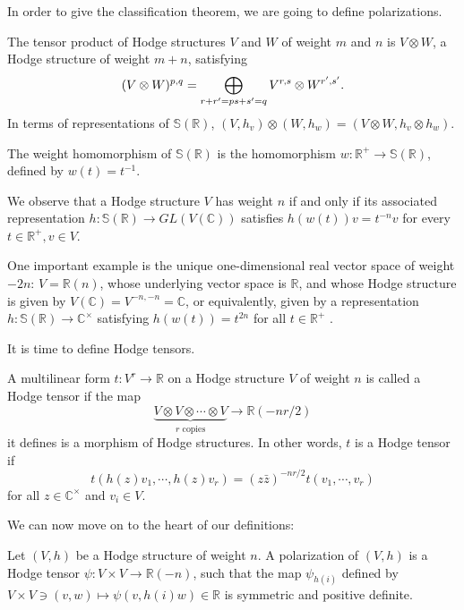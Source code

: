 In order to give the classification theorem, we are going to define polarizations.

\begin{definition}
 \label{definition-tensor-product}
 The tensor product of Hodge structures $V$ and $W$ of weight $m$ and $n$ is $V \otimes W$, a Hodge structure of weight $m+n$, satisfying 
$$
(V\otimes W)^{p,q}=\bigoplus_{r+r'=p \\ s+s'=q} V^{r,s} \otimes W^{r',s'}.
$$
In terms of representations of $\mathbb S(\mathbb R)$, $(V,h_v)\otimes (W,h_w)=(V \otimes W, h_v \otimes h_w)$.
\end{definition}

\begin{definition}
 \label{weight-homomorphism}
 The weight homomorphism of $\mathbb S(\mathbb R)$ is the homomorphism $w:\mathbb R ^+ \to \mathbb S(\mathbb R)$, defined by $w(t)=t^{-1}$.
 \end{definition}
 
 We observe that a Hodge structure $V$ has weight $n$  if and only if its associated representation $h:\mathbb S(\mathbb R) \to GL(V(\mathbb C))$ satisfies $h(w(t))v=t^{-n} v$ for every $t\in \mathbb R^+, v\in V$.

One important example is the unique one-dimensional real vector space of weight $-2n$: $V=\mathbb R(n)$, whose underlying vector space is $\mathbb R$, and whose Hodge structure is given by $V(\mathbb C)=V^{-n,-n}=\mathbb C$, or equivalently, given by a representation $h:\mathbb S(\mathbb R) \to \mathbb C^ \times$ satisfying $h(w(t))=t^{2n}$ for all $t \in \mathbb R^+$ .

It is time to define Hodge tensors. 

\begin{definition}
 \label{definition-Hodge-tensors}
 A multilinear form  $t:V^r \to \mathbb R$ on a Hodge structure $V$ of weight $n$ is called a Hodge tensor if the map
$$
\underbrace{V\otimes V \otimes \cdots \otimes V}_{r \text{ copies}} \to \mathbb R(-nr/2)
$$
it defines is a morphism of Hodge structures. In other words, $t$ is a Hodge tensor if 
$$
t(h(z)v_1,\cdots,h(z)v_r)=(z \bar z)^{-nr/2}t(v_1,\cdots,v_r)
$$
for all $z \in \mathbb C^\times$ and $v_i \in V$.
\end{definition}

We can now move on to the heart of our definitions:

\begin{definition}
\label{definition-polarization}
Let $(V,h)$ be a Hodge structure of weight $n$. A polarization of $(V,h)$ is a Hodge tensor $\psi:V \times V \to \mathbb R(-n)$, such that the map $\psi_{h(i)}$ defined by $V \times V \ni (v,w) \mapsto \psi(v,h(i)w) \in \mathbb R$ is symmetric and positive definite. 
\end{definition}

